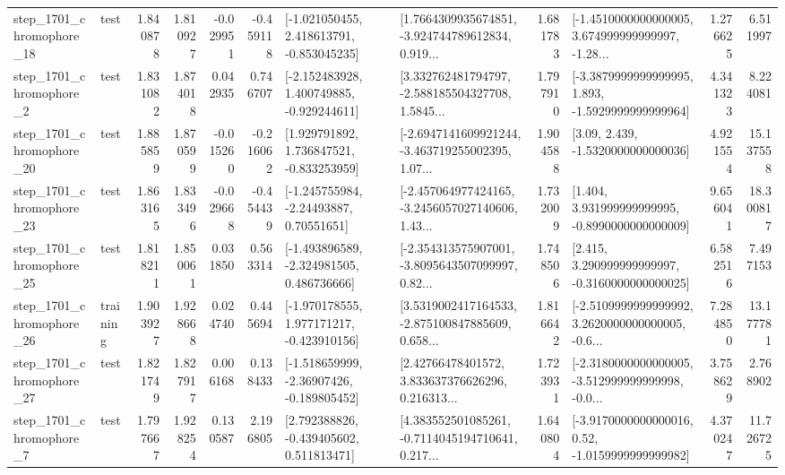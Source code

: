 \begin{tabular}{llrrrrllrlrr}
 step\_1701\_chromophore\_18 &      test &      1.840878 &    1.810927 &     -0.029951 & -0.459118 &   [-1.021050455, 2.418613791, -0.853045235] &  [1.7664309935674851, -3.924744789612834, 0.919... &       1.681783 &  [-1.4510000000000005, 3.674999999999997, -1.28... &            1.276625 &          6.511997 \\
  step\_1701\_chromophore\_2 &      test &      1.831082 &    1.874018 &      0.042935 &  0.746707 &   [-2.152483928, 1.400749885, -0.929244611] &  [3.332762481794797, -2.588185504327708, 1.5845... &       1.797910 &  [-3.3879999999999995, 1.893, -1.5929999999999964] &            4.341323 &          8.224081 \\
 step\_1701\_chromophore\_20 &      test &      1.885859 &    1.870599 &     -0.015260 & -0.216062 &    [1.929791892, 1.736847521, -0.833253959] &  [-2.6947141609921244, -3.463719255002395, 1.07... &       1.904588 &                 [3.09, 2.439, -1.5320000000000036] &            4.921554 &         15.137558 \\
 step\_1701\_chromophore\_23 &      test &      1.863165 &    1.833496 &     -0.029668 & -0.454439 &     [-1.245755984, -2.24493887, 0.70551651] &  [-2.457064977424165, -3.2456057027140606, 1.43... &       1.732009 &    [1.404, 3.931999999999995, -0.8990000000000009] &            9.656041 &         18.300817 \\
 step\_1701\_chromophore\_25 &      test &      1.818211 &    1.850061 &      0.031850 &  0.563314 &   [-1.493896589, -2.324981505, 0.486736666] &  [-2.354313575907001, -3.8095643507099997, 0.82... &       1.748506 &    [2.415, 3.290999999999997, -0.3160000000000025] &            6.582516 &          7.497153 \\
 step\_1701\_chromophore\_26 &  training &      1.903927 &    1.928668 &      0.024740 &  0.445694 &   [-1.970178555, 1.977171217, -0.423910156] &  [3.5319002417164533, -2.875100847885609, 0.658... &       1.816642 &  [-2.5109999999999992, 3.2620000000000005, -0.6... &            7.284850 &         13.177781 \\
 step\_1701\_chromophore\_27 &      test &      1.821749 &    1.827917 &      0.006168 &  0.138433 &   [-1.518659999, -2.36907426, -0.189805452] &  [2.42766478401572, 3.833637376626296, 0.216313... &       1.723931 &  [-2.3180000000000005, -3.512999999999998, -0.0... &            3.758629 &          2.768902 \\
  step\_1701\_chromophore\_7 &      test &      1.797667 &    1.928254 &      0.130587 &  2.196805 &    [2.792388826, -0.439405602, 0.511813471] &  [4.383552501085261, -0.7114045194710641, 0.217... &       1.640804 &   [-3.9170000000000016, 0.52, -1.0159999999999982] &            4.370247 &         11.726725 \\

\end{tabular}
